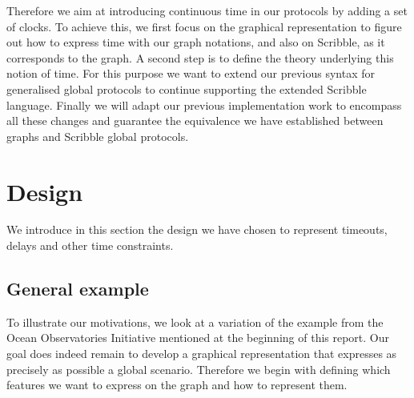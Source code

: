 \documentclass[a4paper,11pt,twoside]{report}
\begin{document}
Therefore we aim at introducing continuous time in our protocols by adding a set of clocks. To achieve this, we first focus on the graphical representation to figure out how to express time with our graph notations, and also on Scribble, as it corresponds to the graph. A second step is to define the theory underlying this notion of time. For this purpose we want to extend our previous syntax for generalised global protocols to continue supporting the extended Scribble language. Finally we will adapt our previous implementation work to encompass all these changes and guarantee the equivalence we have established between graphs and Scribble global protocols.


\section{Design}
We introduce in this section the design we have chosen to represent timeouts, delays and other time constraints. 

\subsection{General example}
To illustrate our motivations, we look at a variation of the example from the Ocean Observatories Initiative mentioned at the beginning of this report. Our goal does indeed remain to develop a graphical representation that expresses as precisely as possible a global scenario. Therefore we begin with defining which features we want to express on the graph and how to represent them.
\end{document}
